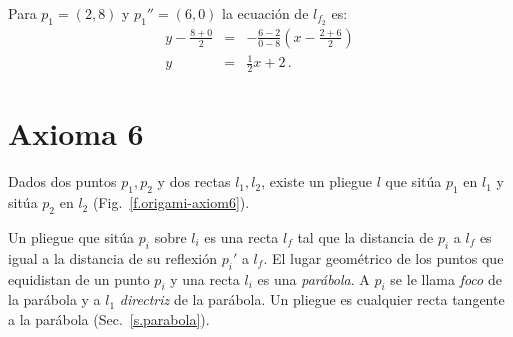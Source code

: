 \begin{example}
Para $p_1=(2,8)$ y $p_1''=(6,0)$ la ecuación de $l_{f_2}$ es:
\begin{eqnarray*}
y-\frac{8+0}{2}&=&-\frac{6-2}{0-8}\left(x-\frac{2+6}{2}\right)\\
y&=&\frac{1}{2}x+2\,.
\end{eqnarray*}
\end{example}


\section{Axioma 6}\label{s.ax6}
\begin{axiom}
Dados dos puntos $p_1,p_2$ y dos rectas $l_1,l_2$, existe un pliegue $l$ que sitúa $p_1$ en $l_1$ y sitúa $p_2$ en $l_2$ (Fig.~\ref{f.origami-axiom6}).
\end{axiom}

Un pliegue que sitúa $p_i$ sobre $l_i$ es una recta $l_f$ tal que la distancia de $p_i$ a $l_f$ es igual a la distancia de su reflexión $p_i'$ a $l_f$. El lugar geométrico de los puntos que equidistan de un punto $p_i$ y una recta $l_i$ es una \emph{parábola}. A $p_i$ se le llama \emph{foco} de la parábola y a $l_1$ \emph{directriz} de la parábola. Un pliegue es cualquier recta tangente a la parábola (Sec.~\ref{s.parabola}).

